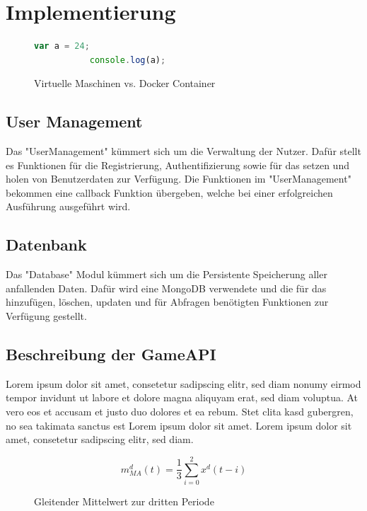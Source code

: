 \documentclass[a4paper]{spie}  %
\begin{document}
\section{Implementierung}

\begin{figure}[h!]
	\centering
        \begin{lstlisting}[language=JavaScript,caption=Javascript Example]
           var a = 24;
           console.log(a);
        \end{lstlisting}
		\caption{Virtuelle Maschinen vs. Docker Container\cite{dockercontainer}}
		\label{fig:dockerVM}
\end{figure}

\subsection{User Management}
Das "UserManagement" kümmert sich um die Verwaltung der Nutzer. Dafür stellt es Funktionen für die Registrierung, Authentifizierung sowie für das setzen und holen von Benutzerdaten zur Verfügung. Die Funktionen im "UserManagement" bekommen eine callback Funktion übergeben, welche bei einer erfolgreichen Ausführung ausgeführt wird.

\subsection{Datenbank}
Das "Database" Modul kümmert sich um die Persistente Speicherung aller anfallenden Daten. Dafür wird eine MongoDB verwendete und die für das hinzufügen, löschen, updaten und für Abfragen benötigten Funktionen zur Verfügung gestellt.

\subsection{Beschreibung der GameAPI}
Lorem ipsum dolor sit amet, consetetur sadipscing elitr, sed diam nonumy eirmod tempor invidunt ut labore et dolore magna aliquyam erat, sed diam voluptua. At vero eos et accusam et justo duo dolores et ea rebum. Stet clita kasd gubergren, no sea takimata sanctus est Lorem ipsum dolor sit amet. Lorem ipsum dolor sit amet, consetetur sadipscing elitr, sed diam.
\begin{figure}
\begin{equation}
  \boxed{{ m }_{ MA }^{ d }(t) = \frac { 1 }{ 3 } \sum _{ i=0 }^{ 2 }{ { x }^{ d }(t-i) }}
\end{equation}
\caption{Gleitender Mittelwert zur dritten Periode}
\label{eqn:middle}
\end{figure}
\end{document}
